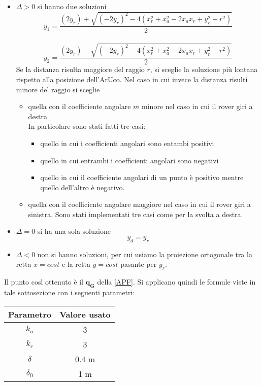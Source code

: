 \begin{itemize}
    \item $\Delta>0$ si hanno due soluzioni
        \begin{equation}
        y_1=\frac{(2y_r)+\sqrt{(-2y_r)^2-4(x_r^2+x_a^2-2x_ax_r+y_r^2-r^2)}}{2}
        \end{equation}
        \\
        \begin{equation}
        y_2=\frac{(2y_r)-\sqrt{(-2y_r)^2-4(x_r^2+x_a^2-2x_ax_r+y_r^2-r^2)}}{2}
        \end{equation}
  Se la distanza risulta maggiore del raggio $r$, si sceglie la soluzione più lontana rispetto alla posizione dell'ArUco.
        Nel caso in cui invece la distanza risulti minore del raggio si sceglie 
        \begin{itemize}
            \item quella con il coefficiente angolare $m$ minore nel caso in cui il rover giri a destra\\In particolare sono stati fatti tre casi:
            \begin{itemize}
            \item quello in cui i coefficienti angolari sono entambi positivi
            \item quello in cui entrambi i coefficienti angolari sono negativi
            \item quello in cui il coefficiente angolari di un punto è positivo mentre quello dell'altro è negativo.
            \end{itemize}
            \item quella con il coefficicnte angolare maggiore nel caso in cui il rover giri a sinistra. Sono stati implementati tre casi come per la svolta a destra.
        \end{itemize}
    \item $\Delta=0$ si ha una sola soluzione
    \begin{equation}
        y_d=y_r
        \end{equation}
    \item $\Delta<0$ non si hanno soluzioni, per cui usiamo la proiezione ortogonale tra la retta $x=cost$ e la retta $y=cost$ pasante per $y_r$.
\end{itemize}
Il punto così ottenuto è il $\boldsymbol{q_G}$ della \autoref{APF}.
Si applicano quindi le formule viste in tale sottosezione con i seguenti parametri:

\begin{table} [H]
    \centering
    \begin{tabular}{|cc|}
    \hline
        Parametro & Valore usato \\  \hline
        $k_a$ &   3   \\  \hline
        $k_r$ &   3\\  \hline
        $\delta$ & 0.4  m \\  \hline
        $\delta_0$ &  1  m\\  \hline
    \end{tabular}
\end{table}


